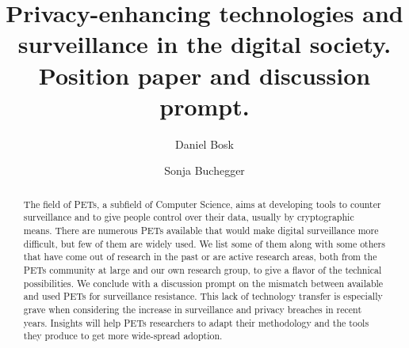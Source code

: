 \title{%
  Privacy-enhancing technologies and surveillance in the digital
  society. Position paper and discussion prompt.
}
\date{}
\author{Daniel Bosk}
\author{Sonja Buchegger}


\mode*

%  




\begin{abstract} 
The field of \acp{PET}, a subfield of Computer Science, aims at
developing tools to counter surveillance and to give people control over
their data, usually by cryptographic means. There are numerous
\acp{PET} available that would make digital surveillance more
difficult, but few of them are widely used. We list some of them along
with some others that have come out of research in the past or are
active research areas, both from the \acp{PET} community at large and
our own research group, to give a flavor of the technical
possibilities. We conclude with a discussion prompt on the mismatch
between available and used \acp{PET} for surveillance resistance. This
lack of technology transfer is especially grave when considering the
increase in surveillance and privacy breaches in recent years.
Insights will help \acp{PET} researchers  to 
adapt their methodology and the tools they produce to get more 
wide-spread adoption.
\end{abstract}

